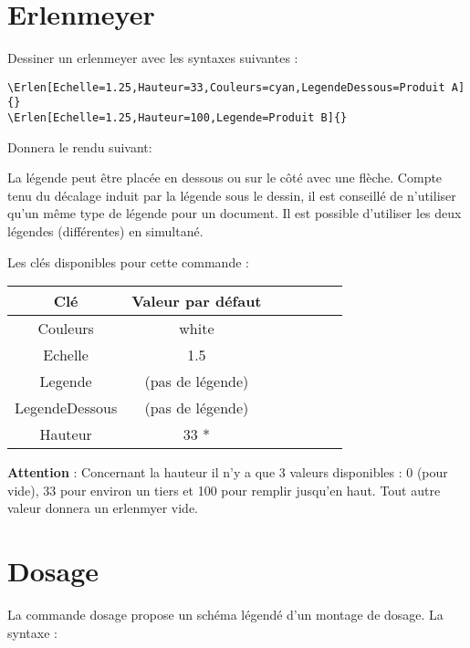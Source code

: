 \documentclass[a4paper,12pt,dvipsnames]{report}
\newcommand{\crh}{\\ \hline}
\newcommand{\important}[1]{%
\vspace{0.5cm}

\begin{imp} 
#1 
\end{imp}
\vspace{0.5cm}%
}
\begin{document}
\newpage
\thispagestyle{fancy}
\section{Erlenmeyer}

Dessiner un erlenmeyer avec les syntaxes suivantes :
\vspace{2cm}

\begin{lstlisting}[style=A]
\Erlen[Echelle=1.25,Hauteur=33,Couleurs=cyan,LegendeDessous=Produit A]{}
\Erlen[Echelle=1.25,Hauteur=100,Legende=Produit B]{}
\end{lstlisting}
\vspace{2cm}

Donnera le rendu suivant:
\begin{center}
\Erlen[Echelle=1.25,Hauteur=33,Couleurs=cyan,LegendeDessous=Produit A]{}\Erlen[Echelle=1.25,Hauteur=100,Legende=Produit B]{}

\end{center}
\vspace{2cm}

La légende peut être placée en dessous ou sur le côté avec une flèche. Compte tenu du décalage induit par la légende sous le dessin, il est conseillé de n'utiliser qu'un même type de légende pour un document. Il est possible d'utiliser les deux légendes (différentes) en simultané.


Les clés disponibles pour cette commande :
\begin{center}
\begin{tabularx}{0.5\textwidth}{|C|C|}
\hline 
\textbf{Clé} & \textbf{Valeur par défaut} \crh
Couleurs & white \crh
Echelle & 1.5 \crh
Legende & {} (pas de légende) \crh
LegendeDessous & {} (pas de légende) \crh
Hauteur & 33 *\crh
\end{tabularx}
\end{center}

\important{\textbf{Attention} : Concernant la hauteur il n'y a que 3 valeurs disponibles : 0 (pour vide), 33 pour environ un tiers et 100 pour remplir jusqu'en haut. Tout autre valeur donnera un erlenmyer vide.}


\newpage
\thispagestyle{fancy}
\section{Dosage}
\thispagestyle{fancy}

La commande dosage propose un schéma légendé d'un montage de dosage. La syntaxe :
\vspace{1cm}
\end{document}
